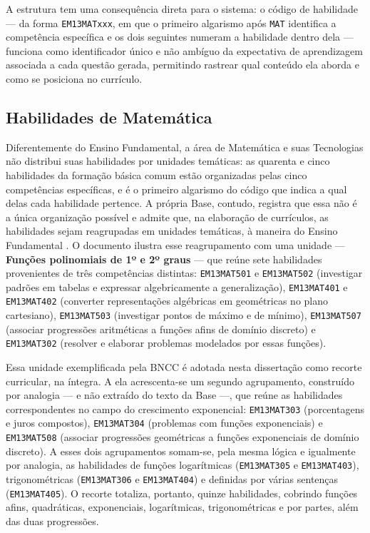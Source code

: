 A estrutura tem uma consequência direta para o sistema: o código de habilidade --- da forma
\texttt{EM13MATxxx}, em que o primeiro algarismo após \texttt{MAT} identifica a competência específica e
os dois seguintes numeram a habilidade dentro dela --- funciona como identificador único e não ambíguo da expectativa de
aprendizagem associada a cada questão gerada, permitindo rastrear qual conteúdo ela aborda e como se
posiciona no currículo.

\subsection{Habilidades de Matemática}
\label{sub:bncc-habilidades}

Diferentemente do Ensino Fundamental, a área de Matemática e suas Tecnologias não distribui suas
habilidades por unidades temáticas: as quarenta e cinco habilidades da formação básica comum estão
organizadas pelas cinco competências específicas, e é o primeiro algarismo do código que indica a qual
delas cada habilidade pertence. A própria Base, contudo, registra que essa não é a única organização
possível e admite que, na elaboração de currículos, as habilidades sejam reagrupadas em unidades
temáticas, à maneira do Ensino Fundamental \citep{brasil2018bncc}. O documento ilustra esse
reagrupamento com uma unidade --- \textbf{Funções polinomiais de 1º e 2º graus} --- que reúne sete
habilidades provenientes de três competências distintas: \texttt{EM13MAT501} e \texttt{EM13MAT502}
(investigar padrões em tabelas e expressar algebricamente a generalização), \texttt{EM13MAT401} e
\texttt{EM13MAT402} (converter representações algébricas em geométricas no plano cartesiano),
\texttt{EM13MAT503} (investigar pontos de máximo e de mínimo), \texttt{EM13MAT507} (associar
progressões aritméticas a funções afins de domínio discreto) e \texttt{EM13MAT302} (resolver e
elaborar problemas modelados por essas funções).

Essa unidade exemplificada pela BNCC é adotada nesta dissertação como recorte curricular, na íntegra.
A ela acrescenta-se um segundo agrupamento, construído por analogia --- e não extraído do texto da Base
---, que reúne as habilidades correspondentes no campo do crescimento exponencial:
\texttt{EM13MAT303} (porcentagens e juros compostos), \texttt{EM13MAT304} (problemas com funções
exponenciais) e \texttt{EM13MAT508} (associar progressões geométricas a funções exponenciais de domínio
discreto). A esses dois agrupamentos somam-se, pela mesma lógica e igualmente por analogia, as
habilidades de funções logarítmicas (\texttt{EM13MAT305} e \texttt{EM13MAT403}),
trigonométricas (\texttt{EM13MAT306} e \texttt{EM13MAT404}) e definidas por várias sentenças
(\texttt{EM13MAT405}). O recorte totaliza, portanto, quinze habilidades, cobrindo funções afins,
quadráticas, exponenciais, logarítmicas, trigonométricas e por partes, além das duas progressões.

